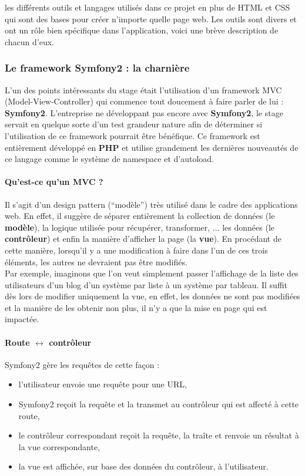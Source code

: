 \documentclass{article}
\begin{document}
\begin{sffamily}
 les différents outils et langages utilisés dans ce projet en plus de HTML et CSS qui sont des bases pour créer n'importe quelle page web. Les 
outils sont divers et ont un rôle bien spécifique dans l'application, voici une brève description de chacun d'eux.

\subsubsection{Le framework Symfony2 : la charnière}

L'un des points intéressants du stage était l'utilisation d'un framework MVC (Model-View-Controller) qui commence tout doucement à faire parler de lui : \textbf{Symfony2}. 
L'entreprise ne développant pas encore avec \textbf{Symfony2}, le stage servait en quelque sorte d'un test grandeur nature afin de déterminer si l'utilisation de ce 
framework pourrait être bénéfique. Ce framework est entièrement développé en \textbf{PHP} et utilise grandement les dernières nouveautés de ce langage comme le système de 
namespace et d'autoload.\\

\paragraph{Qu'est-ce qu'un MVC ?}
Il s'agit d'un design pattern (``modèle'') très utilisé dans le cadre des applications web. En effet, il suggère de séparer entièrement la collection de données (le 
\textbf{modèle}), la logique utilisée pour récupérer, transformer, ... les données (le \textbf{contrôleur}) et enfin la manière d'afficher la page (la \textbf{vue}). En 
procédant de cette manière, lorsqu'il y a une modification à faire dans l'un de ces trois éléments, les autres ne devraient pas être modifiés.\\
Par exemple, imaginons que l'on veut simplement passer l'affichage de la liste des utilisateurs d'un blog d'un système par liste à un système par tableau. Il suffit dès lors 
de modifier uniquement la vue, en effet, les données ne sont pas modifiées et la manière de les obtenir non plus, il n'y a que la mise en page qui est impactée.

\paragraph{Route $\leftrightarrow$ contrôleur}
Symfony2 gère les requêtes de cette façon :
\begin{itemize}
\item l'utilisateur envoie une requête pour une URL,
\item Symfony2 reçoit la requête et la transmet au contrôleur qui est affecté à cette route,
\item le contrôleur correspondant reçoit la requête, la traîte et renvoie un résultat à la vue correspondante,
\item la vue est affichée, sur base des données du contrôleur, à l'utilisateur.
\end{itemize}


\end{sffamily}
\end{document}
